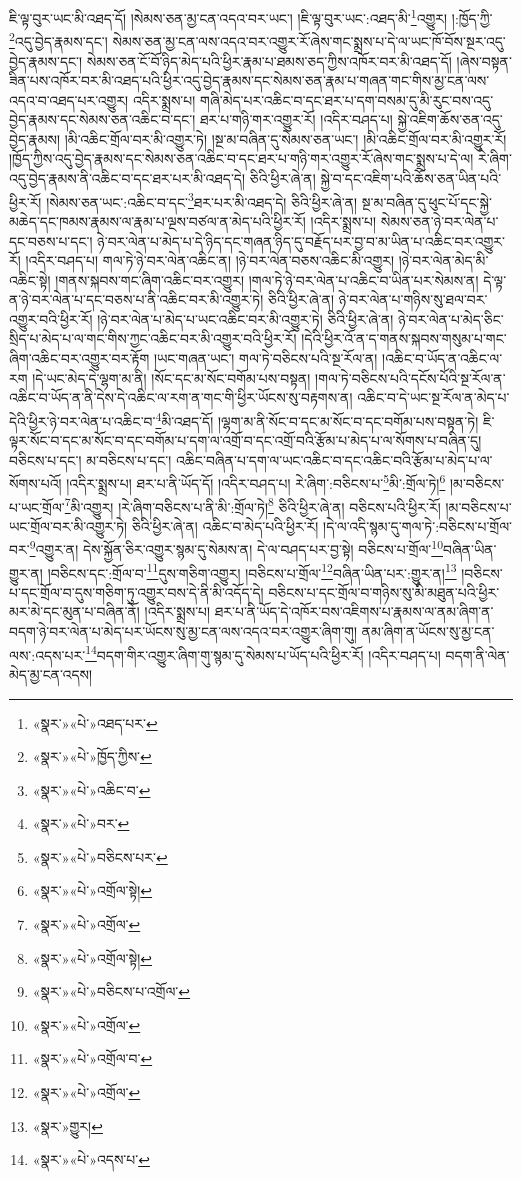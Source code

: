 ཇི་ལྟ་བུར་ཡང་མི་འཐད་དོ། །སེམས་ཅན་མྱ་ངན་འདའ་བར་ཡང་། །ཇི་ལྟ་བུར་ཡང་:འཐད་མི་\footnote{«སྣར་»«པེ་»འཐད་པར་}འགྱུར། །:ཁྱོད་ཀྱི་\footnote{«སྣར་»«པེ་»ཁྱོད་ཀྱིས་}འདུ་བྱེད་རྣམས་དང་། སེམས་ཅན་མྱ་ངན་ལས་འདའ་བར་འགྱུར་རོ་ཞེས་གང་སྨྲས་པ་དེ་ལ་ཡང་ཁོ་བོས་སྔར་འདུ་བྱེད་རྣམས་དང་། སེམས་ཅན་ངོ་བོ་ཉིད་མེད་པའི་ཕྱིར་རྣམ་པ་ཐམས་ཅད་ཀྱིས་འཁོར་བར་མི་འཐད་དོ། །ཞེས་བསྟན་ཟིན་པས་འཁོར་བར་མི་འཐད་པའི་ཕྱིར་འདུ་བྱེད་རྣམས་དང་སེམས་ཅན་རྣམ་པ་གཞན་གང་གིས་མྱ་ངན་ལས་འདའ་བ་འཐད་པར་འགྱུར། འདིར་སྨྲས་པ། གཞི་མེད་པར་འཆིང་བ་དང་ཐར་པ་དག་བསམ་དུ་མི་རུང་བས་འདུ་བྱེད་རྣམས་དང་སེམས་ཅན་འཆིང་བ་དང་། ཐར་པ་གཉི་གར་འགྱུར་རོ། །འདིར་བཤད་པ། སྐྱེ་འཇིག་ཆོས་ཅན་འདུ་བྱེད་རྣམས། །མི་འཆིང་གྲོལ་བར་མི་འགྱུར་ཏེ། །སྔ་མ་བཞིན་དུ་སེམས་ཅན་ཡང་། །མི་འཆིང་གྲོལ་བར་མི་འགྱུར་རོ། །ཁྱོད་ཀྱིས་འདུ་བྱེད་རྣམས་དང་སེམས་ཅན་འཆིང་བ་དང་ཐར་པ་གཉི་གར་འགྱུར་རོ་ཞེས་གང་སྨྲས་པ་དེ་ལ། རེ་ཞིག་འདུ་བྱེད་རྣམས་ནི་འཆིང་བ་དང་ཐར་པར་མི་འཐད་དེ། ཅིའི་ཕྱིར་ཞེ་ན། སྐྱེ་བ་དང་འཇིག་པའི་ཆོས་ཅན་ཡིན་པའི་ཕྱིར་རོ། །སེམས་ཅན་ཡང་:འཆིང་བ་དང་\footnote{«སྣར་»«པེ་»འཆིང་བ་}ཐར་པར་མི་འཐད་དེ། ཅིའི་ཕྱིར་ཞེ་ན། སྔ་མ་བཞིན་དུ་ཕུང་པོ་དང་སྐྱེ་མཆེད་དང་ཁམས་རྣམས་ལ་རྣམ་པ་ལྔས་བཙལ་ན་མེད་པའི་ཕྱིར་རོ། །འདིར་སྨྲས་པ། སེམས་ཅན་ཉེ་བར་ལེན་པ་དང་བཅས་པ་དང་། ཉེ་བར་ལེན་པ་མེད་པ་དེ་ཉིད་དང་གཞན་ཉིད་དུ་བརྗོད་པར་བྱ་བ་མ་ཡིན་པ་འཆིང་བར་འགྱུར་རོ། །འདིར་བཤད་པ། གལ་ཏེ་ཉེ་བར་ལེན་འཆིང་ན། །ཉེ་བར་ལེན་བཅས་འཆིང་མི་འགྱུར། །ཉེ་བར་ལེན་མེད་མི་འཆིང་སྟེ། །གནས་སྐབས་གང་ཞིག་འཆིང་བར་འགྱུར། །གལ་ཏེ་ཉེ་བར་ལེན་པ་འཆིང་བ་ཡིན་པར་སེམས་ན། དེ་ལྟ་ན་ཉེ་བར་ལེན་པ་དང་བཅས་པ་ནི་འཆིང་བར་མི་འགྱུར་ཏེ། ཅིའི་ཕྱིར་ཞེ་ན། ཉེ་བར་ལེན་པ་གཉིས་སུ་ཐལ་བར་འགྱུར་བའི་ཕྱིར་རོ། །ཉེ་བར་ལེན་པ་མེད་པ་ཡང་འཆིང་བར་མི་འགྱུར་ཏེ། ཅིའི་ཕྱིར་ཞེ་ན། ཉེ་བར་ལེན་པ་མེད་ཅིང་སྲིད་པ་མེད་པ་ལ་གང་གིས་ཀྱང་འཆིང་བར་མི་འགྱུར་བའི་ཕྱིར་རོ། །དེའི་ཕྱིར་འོ་ན་ད་གནས་སྐབས་གསུམ་པ་གང་ཞིག་འཆིང་བར་འགྱུར་བར་རྟོག །ཡང་གཞན་ཡང་། གལ་ཏེ་བཅིངས་པའི་སྔ་རོལ་ན། །འཆིང་བ་ཡོད་ན་འཆིང་ལ་རག །དེ་ཡང་མེད་དེ་ལྷག་མ་ནི། །སོང་དང་མ་སོང་བགོམ་པས་བསྟན། །གལ་ཏེ་བཅིངས་པའི་དངོས་པོའི་སྔ་རོལ་ན་འཆིང་བ་ཡོད་ན་ནི་དེས་དེ་འཆིང་ལ་རག་ན་གང་གི་ཕྱིར་ཡོངས་སུ་བརྟགས་ན། འཆིང་བ་དེ་ཡང་སྔ་རོལ་ན་མེད་པ་དེའི་ཕྱིར་ཉེ་བར་ལེན་པ་འཆིང་བ་\footnote{«སྣར་»«པེ་»བར་}མི་འཐད་དོ། །ལྷག་མ་ནི་སོང་བ་དང་མ་སོང་བ་དང་བགོམ་པས་བསྟན་ཏེ། ཇི་ལྟར་སོང་བ་དང་མ་སོང་བ་དང་བགོམ་པ་དག་ལ་འགྲོ་བ་དང་འགྲོ་བའི་རྩོམ་པ་མེད་པ་ལ་སོགས་པ་བཞིན་དུ། བཅིངས་པ་དང་། མ་བཅིངས་པ་དང་། འཆིང་བཞིན་པ་དག་ལ་ཡང་འཆིང་བ་དང་འཆིང་བའི་རྩོམ་པ་མེད་པ་ལ་སོགས་པའོ། །འདིར་སྨྲས་པ། ཐར་པ་ནི་ཡོད་དོ། །འདིར་བཤད་པ། རེ་ཞིག་:བཅིངས་པ་\footnote{«སྣར་»«པེ་»བཅིངས་པར་}མི་:གྲོལ་ཏེ།\footnote{«སྣར་»«པེ་»འགྲོལ་སྟེ།} །མ་བཅིངས་པ་ཡང་གྲོལ་\footnote{«སྣར་»«པེ་»འགྲོལ་}མི་འགྱུར། །རེ་ཞིག་བཅིངས་པ་ནི་མི་:གྲོལ་ཏེ།\footnote{«སྣར་»«པེ་»འགྲོལ་སྟེ།} ཅིའི་ཕྱིར་ཞེ་ན། བཅིངས་པའི་ཕྱིར་རོ། །མ་བཅིངས་པ་ཡང་གྲོལ་བར་མི་འགྱུར་ཏེ། ཅིའི་ཕྱིར་ཞེ་ན། འཆིང་བ་མེད་པའི་ཕྱིར་རོ། །དེ་ལ་འདི་སྙམ་དུ་གལ་ཏེ་:བཅིངས་པ་གྲོལ་བར་\footnote{«སྣར་»«པེ་»བཅིངས་པ་འགྲོལ་}འགྱུར་ན། དེས་སྐྱོན་ཅིར་འགྱུར་སྙམ་དུ་སེམས་ན། དེ་ལ་བཤད་པར་བྱ་སྟེ། བཅིངས་པ་གྲོལ་\footnote{«སྣར་»«པེ་»འགྲོལ་}བཞིན་ཡིན་གྱུར་ན། །བཅིངས་དང་:གྲོལ་བ་\footnote{«སྣར་»«པེ་»འགྲོལ་བ་}དུས་གཅིག་འགྱུར། །བཅིངས་པ་གྲོལ་\footnote{«སྣར་»«པེ་»འགྲོལ་}བཞིན་ཡིན་པར་:གྱུར་ན།\footnote{«སྣར་»གྱུར།} །བཅིངས་པ་དང་གྲོལ་བ་དུས་གཅིག་ཏུ་འགྱུར་བས་དེ་ནི་མི་འདོད་དེ། བཅིངས་པ་དང་གྲོལ་བ་གཉིས་སུ་མི་མཐུན་པའི་ཕྱིར་མར་མེ་དང་མུན་པ་བཞིན་ནོ། །འདིར་སྨྲས་པ། ཐར་པ་ནི་ཡོད་དེ་འཁོར་བས་འཇིགས་པ་རྣམས་ལ་ནམ་ཞིག་ན་བདག་ཉེ་བར་ལེན་པ་མེད་པར་ཡོངས་སུ་མྱ་ངན་ལས་འདའ་བར་འགྱུར་ཞིག་གུ། ནམ་ཞིག་ན་ཡོངས་སུ་མྱ་ངན་ལས་:འདས་པར་\footnote{«སྣར་»«པེ་»འདས་པ་}བདག་གིར་འགྱུར་ཞིག་གུ་སྙམ་དུ་སེམས་པ་ཡོད་པའི་ཕྱིར་རོ། །འདིར་བཤད་པ། བདག་ནི་ལེན་མེད་མྱ་ངན་འདས། 